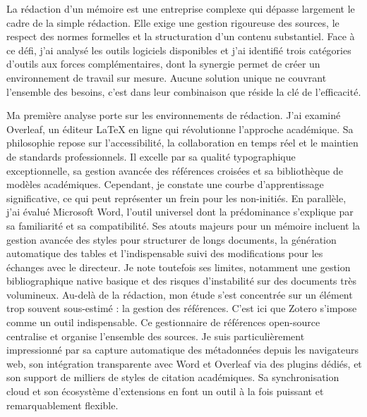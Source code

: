 \documentclass[12pt, a4paper]{article}
\begin{document}
		La rédaction d'un mémoire est une entreprise complexe qui dépasse largement le cadre de la simple rédaction. Elle exige une gestion rigoureuse des sources, le respect des normes formelles et la structuration d'un contenu substantiel. Face à ce défi, j'ai analysé les outils logiciels disponibles et j'ai identifié trois catégories d'outils aux forces complémentaires, dont la synergie permet de créer un environnement de travail sur mesure. Aucune solution unique ne couvrant l'ensemble des besoins, c'est dans leur combinaison que réside la clé de l'efficacité.
		
		Ma première analyse porte sur les environnements de rédaction. J'ai examiné Overleaf, un éditeur LaTeX en ligne qui révolutionne l'approche académique. Sa philosophie repose sur l'accessibilité, la collaboration en temps réel et le maintien de standards professionnels. Il excelle par sa qualité typographique exceptionnelle, sa gestion avancée des références croisées et sa bibliothèque de modèles académiques. Cependant, je constate une courbe d'apprentissage significative, ce qui peut représenter un frein pour les non-initiés. En parallèle, j'ai évalué Microsoft Word, l'outil universel dont la prédominance s'explique par sa familiarité et sa compatibilité. Ses atouts majeurs pour un mémoire incluent la gestion avancée des styles pour structurer de longs documents, la génération automatique des tables et l'indispensable suivi des modifications pour les échanges avec le directeur. Je note toutefois ses limites, notamment une gestion bibliographique native basique et des risques d'instabilité sur des documents très volumineux. Au-delà de la rédaction, mon étude s'est concentrée sur un élément trop souvent sous-estimé : la gestion des références. C'est ici que Zotero s'impose comme un outil indispensable. Ce gestionnaire de références open-source centralise et organise l'ensemble des sources. Je suis particulièrement impressionné par sa capture automatique des métadonnées depuis les navigateurs web, son intégration transparente avec Word et Overleaf via des plugins dédiés, et son support de milliers de styles de citation académiques. Sa synchronisation cloud et son écosystème d'extensions en font un outil à la fois puissant et remarquablement flexible.
		
\end{document}
